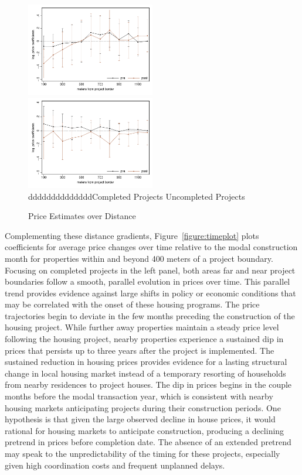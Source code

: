 \documentclass[12pt]{article}
\begin{document}
\begin{figure}
\caption{Price Estimates over Distance}\label{figure:distplot}
\includegraphics[width=0.5\textwidth,trim={.77cm 0cm .21cm 0cm}]{figures/distplot.pdf}
\includegraphics[width=0.5\textwidth,trim={.77cm 0cm .21cm 0cm},clip]{figures/distplot_placebo.pdf}\\
{\color{white}dddddddddddddd}Completed Projects \hspace{4.2cm} Uncompleted Projects
\end{figure}

Complementing these distance gradients, Figure~\ref{figure:timeplot} plots coefficients for average price changes over time relative to the modal construction month for properties within and beyond 400 meters of a project boundary.  Focusing on completed projects in the left panel, both areas far and near project boundaries follow a smooth, parallel evolution in prices over time.  This parallel trend provides evidence against large shifts in policy or economic conditions that may be correlated with the onset of these housing programs.  The price trajectories begin to deviate in the few months preceding the construction of the housing project.  While further away properties maintain a steady price level following the housing project, nearby properties experience a sustained dip in prices that persists up to three years after the project is implemented.  The sustained reduction in housing prices provides evidence for a lasting structural change in local housing market instead of a temporary resorting of households from nearby residences to project houses.  The dip in prices begins in the couple months before the modal transaction year, which is consistent with nearby housing markets anticipating projects during their construction periods.  One hypothesis is that given the large observed decline in house prices, it would rational for housing markets to anticipate construction, producing a declining pretrend in prices before completion date.  The absence of an extended pretrend may speak to the unpredictability of the timing for these projects, especially given high coordination costs and frequent unplanned delays.
\end{document}
